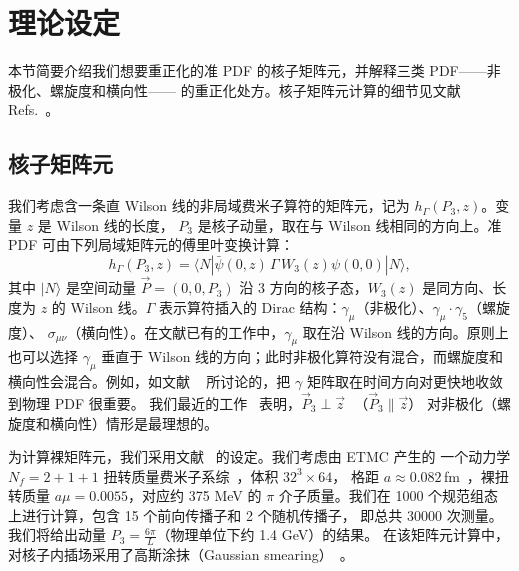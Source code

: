 \section{理论设定}

本节简要介绍我们想要重正化的准 PDF 的核子矩阵元，并解释三类 PDF——非极化、螺旋度和横向性——
的重正化处方。核子矩阵元计算的细节见文献 Refs.~\cite{Alexandrou:2015rja,Alexandrou:2016jqi}。

\vspace*{0.25cm}
\subsection{核子矩阵元}
\vspace*{0.15cm}

我们考虑含一条直 Wilson 线的非局域费米子算符的矩阵元，记为 $h_\Gamma(P_3,z)$。变量 $z$ 是 Wilson 线的长度，
$P_3$ 是核子动量，取在与 Wilson 线相同的方向上。准 PDF 可由下列局域矩阵元的傅里叶变换计算：
\begin{equation}
\label{MElements}
h_\Gamma(P_3,z)=\langle N |\bar{\psi}(0,z)\,\Gamma \,W_3(z) \psi(0,0) |N\rangle,
\end{equation}
其中 $|N\rangle$ 是空间动量 $\vec{P}{=}(0,0,P_3)$ 沿 $3$ 方向的核子态，$W_3(z)$ 是同方向、长度为 $z$ 的
Wilson 线。$\Gamma$ 表示算符插入的 Dirac 结构：$\gamma_\mu$（非极化）、$\gamma_\mu\cdot\gamma_5$（螺旋度）、
$\sigma_{\mu \nu}$（横向性）。在文献已有的工作中，$\gamma_\mu$ 取在沿 Wilson 线的方向。原则上也可以选择
$\gamma_\mu$ 垂直于 Wilson 线的方向；此时非极化算符没有混合，而螺旋度和横向性会混合。例如，如文献
~\cite{Radyushkin:2016hsy} 所讨论的，把 $\gamma$ 矩阵取在时间方向对更快地收敛到物理 PDF 很重要。
我们最近的工作~\cite{Constantinou:2017sej} 表明，$\vec P_3 {\perp} \vec z$ \,\,（$\vec P_3 {\parallel} \vec z$）
对非极化（螺旋度和横向性）情形是最理想的。

\medskip
为计算裸矩阵元，我们采用文献~\cite{Alexandrou:2016jqi} 的设定。我们考虑由 ETMC 产生的
一个动力学 $N_f{=}2{+}1{+}1$ 扭转质量费米子系综~\cite{Baron:2010bv}，体积 $32^3 {\times} 64$，
格距 $a {\approx}0.082$\,fm~\cite{Carrasco:2014cwa}，裸扭转质量 $a\mu {=} 0.0055$，对应约 375 MeV 的
$\pi$ 介子质量。我们在 1000 个规范组态上进行计算，包含 15 个前向传播子和 2 个随机传播子，
即总共 30000 次测量。我们将给出动量 $P_3=\frac{6\pi}{L}$（物理单位下约 1.4 GeV）的结果。
在该矩阵元计算中，对核子内插场采用了高斯涂抹（Gaussian smearing）~\cite{Alexandrou:2016jqi}。

